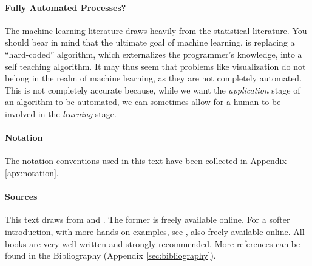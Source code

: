\paragraph{Fully Automated Processes?}
The machine learning literature draws heavily from the statistical literature. 
You should bear in mind that the ultimate goal of machine learning, is replacing a ``hard-coded'' algorithm, which externalizes the programmer's knowledge, into a self teaching algorithm. 
It may thus seem that problems like visualization do not belong in the realm of machine learning, as they are not completely automated.
This is not completely accurate because, while we want the \emph{application} stage of an algorithm to be automated, we can sometimes allow for a human to be involved in the \emph{learning} stage. 


\paragraph{Notation}
The notation conventions used in this text have been collected in Appendix \ref{apx:notation}.

\paragraph{Sources}
This text draws from \cite{hastie_elements_2003} and \cite{shalev-shwartz_understanding_2014}.
The former is freely available online.
For a softer introduction, with more hands-on examples, see \cite{james_introduction_2013}, also freely available online.
All books are very well written and strongly recommended.
More references can be found in the Bibliography (Appendix \ref{sec:bibliography}).

